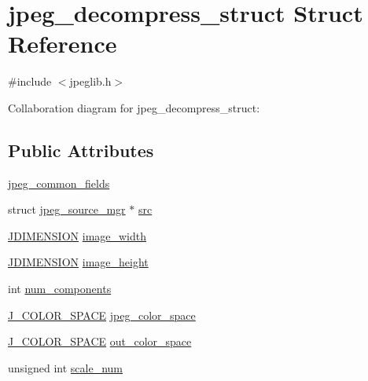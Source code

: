 \hypertarget{structjpeg__decompress__struct}{}\section{jpeg\+\_\+decompress\+\_\+struct Struct Reference}
\label{structjpeg__decompress__struct}


{\ttfamily \#include $<$jpeglib.\+h$>$}



Collaboration diagram for jpeg\+\_\+decompress\+\_\+struct\+:
\subsection*{Public Attributes}
\begin{DoxyCompactItemize}
\item 
\mbox{\hyperlink{structjpeg__decompress__struct_a62d872add9f188d06908d327da2a24fd}{jpeg\+\_\+common\+\_\+fields}}
\item 
struct \mbox{\hyperlink{structjpeg__source__mgr}{jpeg\+\_\+source\+\_\+mgr}} $\ast$ \mbox{\hyperlink{structjpeg__decompress__struct_aa0f9a673100231cfd81f17b789784785}{src}}
\item 
\mbox{\hyperlink{jmorecfg_8h_a04ed4674f6f1d0d50ec241531e38274f}{J\+D\+I\+M\+E\+N\+S\+I\+ON}} \mbox{\hyperlink{structjpeg__decompress__struct_a433c0a54f42dfd3d2977ea967b9a21ee}{image\+\_\+width}}
\item 
\mbox{\hyperlink{jmorecfg_8h_a04ed4674f6f1d0d50ec241531e38274f}{J\+D\+I\+M\+E\+N\+S\+I\+ON}} \mbox{\hyperlink{structjpeg__decompress__struct_ad711fae8063a3e75e3c0cccd8512bedf}{image\+\_\+height}}
\item 
int \mbox{\hyperlink{structjpeg__decompress__struct_a15d5e8c34e5c66983eda5c0070f0be95}{num\+\_\+components}}
\item 
\mbox{\hyperlink{jpeglib_8h_a6ea40239360b06efe6377f125f1134f3}{J\+\_\+\+C\+O\+L\+O\+R\+\_\+\+S\+P\+A\+CE}} \mbox{\hyperlink{structjpeg__decompress__struct_a980b92cd751cbc72cc7edd1f9ef2c3e4}{jpeg\+\_\+color\+\_\+space}}
\item 
\mbox{\hyperlink{jpeglib_8h_a6ea40239360b06efe6377f125f1134f3}{J\+\_\+\+C\+O\+L\+O\+R\+\_\+\+S\+P\+A\+CE}} \mbox{\hyperlink{structjpeg__decompress__struct_a4e69e870df7b81671043374d01efc14f}{out\+\_\+color\+\_\+space}}
\item 
unsigned int \mbox{\hyperlink{structjpeg__decompress__struct_a6c87b02686e69267d26e28c5d3775469}{scale\+\_\+num}}
\item 

\end{DoxyCompactItemize}
